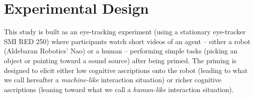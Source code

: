 \documentclass[lettersize, noapacite, twoside, HRI]{apa_HRI}
\newcommand{\h}[1]{\textbf{H#1}\xspace}
\begin{document}

%
%
%
%
%
%
%


\section{Experimental Design}
\label{sec:design}

This study is built as an eye-tracking experiment (using a stationary
eye-tracker SMI RED 250) where participants watch short videos of an agent --
either a robot (Aldebaran Robotics' Nao) or a human -- performing simple tasks
(picking an object or pointing toward a sound source) after being primed.  The
priming is designed to elicit either low cognitive ascriptions onto the robot
(leading to what we call hereafter a \emph{machine-like} interaction situation)
or richer cognitive ascriptions (leaning toward what we call a \emph{human-like}
interaction situation).
\end{document}
